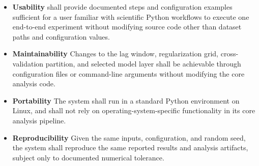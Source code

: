 \documentclass[12pt]{article}
\newcounter{nfrnum} %
\begin{document}

\noindent \begin{itemize}

\item[NFR\refstepcounter{nfrnum}\thenfrnum \label{NFR_Usability}:]
\textbf{Usability} 
\progname{} shall provide documented steps and configuration examples sufficient for a user familiar with scientific Python workflows to execute one end-to-end experiment without modifying source code other than dataset paths and configuration values.

\item[NFR\refstepcounter{nfrnum}\thenfrnum \label{NFR_Maintainability}:]
\textbf{Maintainability} 
Changes to the lag window, regularization grid, cross-validation partition, and selected model layer shall be achievable through configuration files or command-line arguments without modifying the core analysis code.

\item[NFR\refstepcounter{nfrnum}\thenfrnum \label{NFR_Portability}:]
\textbf{Portability} 
The system shall run in a standard Python environment on Linux, and shall not rely on operating-system-specific functionality in its core analysis pipeline.

\item[NFR\refstepcounter{nfrnum}\thenfrnum \label{NFR_repro}:]
\textbf{Reproducibility} 
Given the same inputs, configuration, and random seed, the system shall reproduce the same reported results and analysis artifacts, subject only to documented numerical tolerance. 





\end{itemize}
\end{document}
